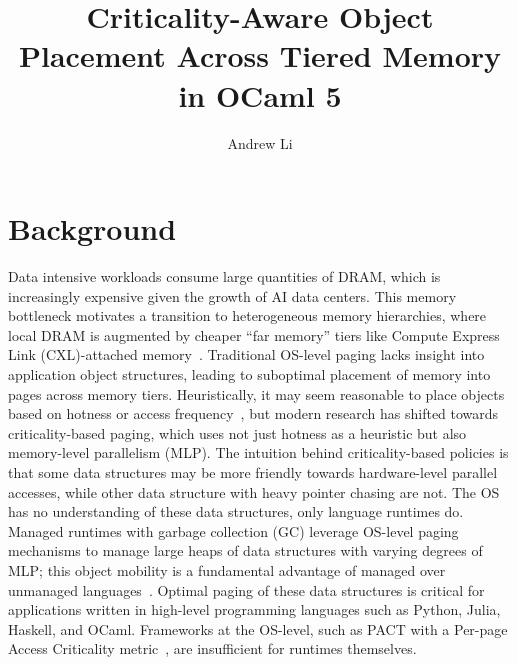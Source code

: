 \documentclass[sigconf]{acmart}
\begin{document}
\title{Criticality-Aware Object Placement Across Tiered Memory in OCaml 5}

\author{Andrew Li}




\maketitle

\section{Background}

Data intensive workloads consume large quantities of DRAM, which is increasingly expensive given the growth of AI data centers. This memory bottleneck motivates a transition to heterogeneous memory hierarchies, where local DRAM is augmented by cheaper ``far memory'' tiers like Compute Express Link (CXL)-attached memory~\cite{cxl2024}. Traditional OS-level paging lacks insight into application object structures, leading to suboptimal placement of memory into pages across memory tiers. Heuristically, it may seem reasonable to place objects based on hotness or access frequency~\cite{merchandiser2023}, but modern research has shifted towards criticality-based paging, which uses not just hotness as a heuristic but also memory-level parallelism (MLP). The intuition behind criticality-based policies is that some data structures may be more friendly towards hardware-level parallel accesses, while other data structure with heavy pointer chasing are not. The OS has no understanding of these data structures, only language runtimes do. Managed runtimes with garbage collection (GC) leverage OS-level paging mechanisms to manage large heaps of data structures with varying degrees of MLP; this object mobility is a fundamental advantage of managed over unmanaged languages~\cite{alaska2024}. Optimal paging of these data structures is critical for applications written in high-level programming languages such as Python, Julia, Haskell, and OCaml. Frameworks at the OS-level, such as PACT with a Per-page Access Criticality metric~\cite{pact2026}, are insufficient for runtimes themselves.
\end{document}
